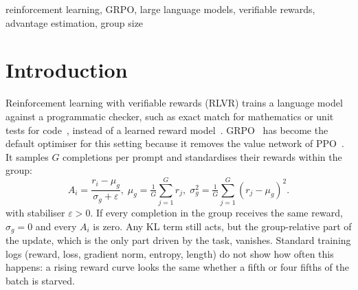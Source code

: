 \begin{abstract}
We study zero-variance groups in short-horizon GRPO-family training.
Uniform outcome rewards give zero centred advantages, but a thresholded
Zero-Variance Fraction (ZVF) is only a diagnostic proxy. A single-seed,
four-arm GSM8K training panel ($G=8$, 40 steps) gives ZVF 0.71--0.77;
three separately stored GSM8K sampling evaluations give pooled 0.1583 and
are not the same population. Pairwise contrast density (PCD) is
a variance-scale proxy, not a pair-disagreement fraction or a signed mastery
signal. The Bernoulli identity $h_G(p)=p^G+(1-p)^G$ assumes conditionally
i.i.d. rewards; pooled-rate comparisons and resampling uniform observed
vectors do not independently validate it. A live adaptive arm records the
same point gain as a fixed recipe at higher rollout cost. A separate offline
trace has 92.3\% of escalations on observed all-correct groups, not proven
true boundary prompts. No controller superiority or general optimum is established.
\end{abstract}

\begin{IEEEkeywords}
reinforcement learning, GRPO, large language models, verifiable rewards,
advantage estimation, group size
\end{IEEEkeywords}

\section{Introduction}

Reinforcement learning with verifiable rewards (RLVR) trains a language model
against a programmatic checker, such as exact match for mathematics or unit
tests for code~\cite{lambert2024tulu3}, instead of a learned reward model~\cite{ouyang2022training}.
GRPO~\cite{shao2024deepseekmath,guo2025deepseekr1} has become the default
optimiser for this setting because it removes the value network of
PPO~\cite{schulman2017proximal}. It samples $G$ completions per prompt and
standardises their rewards within the group:
\begin{equation}
A_i = \frac{r_i - \mu_g}{\sigma_g + \varepsilon},\;
\mu_g = \tfrac{1}{G}\textstyle\sum_{j=1}^{G} r_j,\;
\sigma_g^2 = \tfrac{1}{G}\textstyle\sum_{j=1}^{G} (r_j-\mu_g)^2 .
\label{eq:adv}
\end{equation}
with stabiliser $\varepsilon>0$. If every completion in the group receives the same reward, $\sigma_g = 0$ and
every $A_i$ is zero. Any KL term still acts, but the group-relative part of
the update, which is the only part driven by the task, vanishes. Standard
training logs (reward, loss, gradient norm, entropy, length) do not show how
often this happens: a rising reward curve looks the same whether a fifth or
four fifths of the batch is starved.

